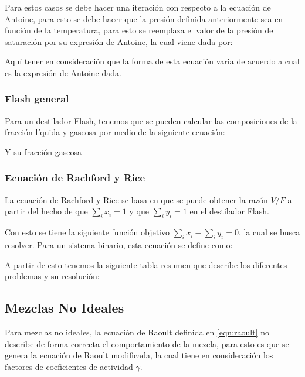 Para estos casos se debe hacer una iteración con respecto a la ecuación de Antoine, para esto se debe hacer que la presión definida anteriormente sea
en función de la temperatura, para esto se reemplaza el valor de la presión de saturación por su expresión de Antoine, la cual viene dada por:


Aquí tener en consideración que la forma de esta ecuación varia de acuerdo a cual es la expresión de Antoine dada.

\subsubsection{Flash general}

Para un destilador Flash, tenemos que se pueden calcular las composiciones de la fracción líquida y gaseosa por medio de la siguiente ecuación:


Y su fracción gaseosa


\subsubsection{Ecuación de Rachford y Rice}

La ecuación de Rachford y Rice se basa en que se puede obtener la razón $V/F$ a partir del hecho de que $\sum_i  x_i=1$ y que $\sum_i y_i=1$ en el destilador Flash.

Con esto se tiene la siguiente función objetivo $\sum_i x_i - \sum_i y_i = 0$, la cual se busca resolver. Para un sistema binario, esta ecuación se define como:


A partir de esto tenemos la siguiente tabla resumen que describe los diferentes problemas y su resolución:

\clearpage
\subsection{Mezclas No Ideales}

Para mezclas no ideales, la ecuación de Raoult definida en \ref{eqn:raoult} no describe de forma correcta el comportamiento de la mezcla, para esto es que 
se genera la ecuación de Raoult modificada, la cual tiene en consideración los factores de coeficientes de actividad $\gamma$.

